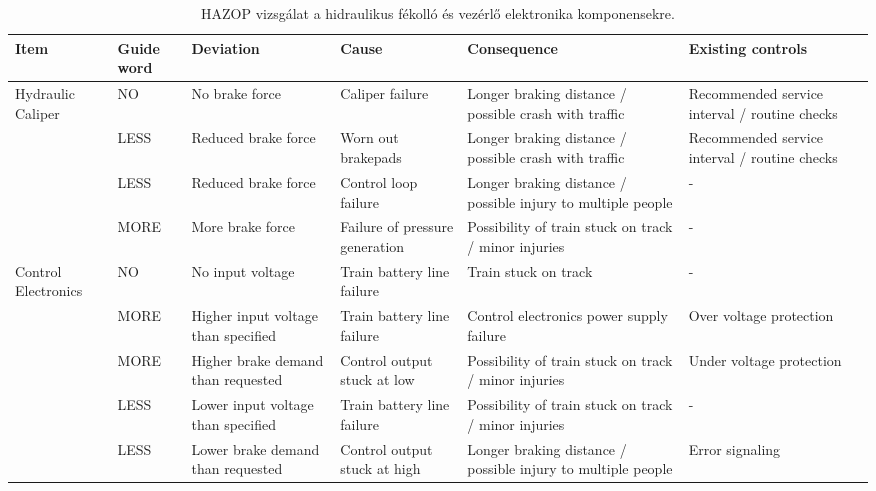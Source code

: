 \begin{table}
    \centering
    \begin{tabular}{ |p{18mm}|p{15mm}|p{20mm}|p{20mm}|p{25mm}|p{25mm}| }
        \hline
        Item & Guide word & Deviation & Cause & Consequence & Existing controls \\
        \hline
        Hydraulic Caliper & NO & No brake force & Caliper failure & Longer braking distance / possible crash with traffic & Recommended service interval / routine checks \\
        & LESS & Reduced brake force & Worn out brakepads & Longer braking distance / possible crash with traffic & Recommended service interval / routine checks \\
        & LESS & Reduced brake force & Control loop failure & Longer braking distance / possible injury to multiple people & - \\
        & MORE & More brake force & Failure of pressure generation & Possibility of train stuck on track / minor injuries & - \\
        \hline
        Control Electronics & NO & No input voltage & Train battery line failure & Train stuck on track & - \\
        & MORE & Higher input voltage than specified & Train battery line failure & Control electronics power supply failure & Over voltage protection \\
        & MORE & Higher brake demand than requested & Control output stuck at low & Possibility of train stuck on track / minor injuries & Under voltage protection \\
        & LESS & Lower input voltage than specified & Train battery line failure & Possibility of train stuck on track / minor injuries & - \\
        & LESS & Lower brake demand than requested & Control output stuck at high & Longer braking distance / possible injury to multiple people & Error signaling \\
        \hline
    \end{tabular}
    \caption{HAZOP vizsgálat a hidraulikus fékolló és vezérlő elektronika komponensekre.}
    \label{tab:hazop_vizsg}
\end{table}